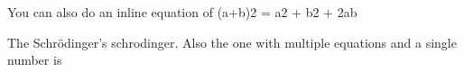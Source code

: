 

You can also do an inline equation of (a+b)2 = a2 + b2 + 2ab

The Schr\"{o}dinger's schrodinger. Also the one with multiple 
equations and a single number is


%
%
%
%
%

